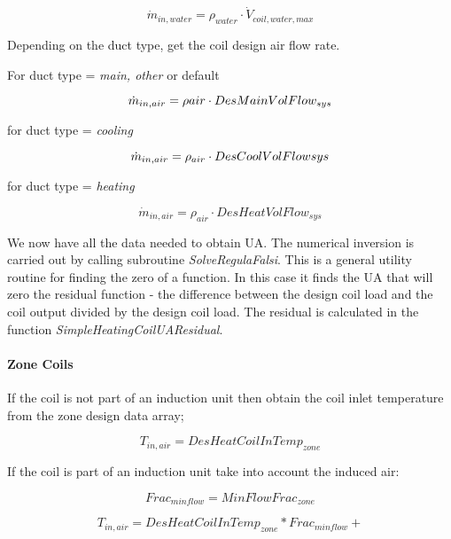 \begin{equation}
\dot m_{in,water} = \rho_{water} \cdot \dot V_{coil,water,max}
\end{equation}

Depending on the duct type, get the coil design air flow rate.

For duct type = \emph{main, other} or default

\begin{equation}
\emph{\(\dot m_{in,air} = \rho{air} \cdot DesMainVolFlow_{sys}\)}
\end{equation}

for duct type = \emph{cooling}

\begin{equation}
\emph{\(\dot m_{in,air} = \rho_{air} \cdot DesCoolVolFlowsys\)}
\end{equation}

for duct type = \emph{heating}

\begin{equation}
\dot m_{in,air} = \rho_{air} \cdot DesHeatVolFlow_{sys}
\end{equation}

We now have all the data needed to obtain UA. The numerical inversion is carried out by calling subroutine \emph{SolveRegulaFalsi}. This is a general utility routine for finding the zero of a function. In this case it finds the UA that will zero the residual function - the difference between the design coil load and the coil output divided by the design coil load. The residual is calculated in the function \emph{SimpleHeatingCoilUAResidual}.

\paragraph{Zone Coils}\label{zone-coils-1}

If the coil is not part of an induction unit then obtain the coil inlet temperature from the zone design data array;

\begin{equation}
T_{in,air} = DesHeatCoilInTemp_{zone}
\end{equation}

If the coil is part of an induction unit take into account the induced air:

\begin{equation}
Frac_{minflow} = MinFlowFrac_{zone}
\end{equation}

\begin{equation}
T_{in,air} = DesHeatCoilInTemp_{zone} * Frac_{minflow} +
\end{equation}

